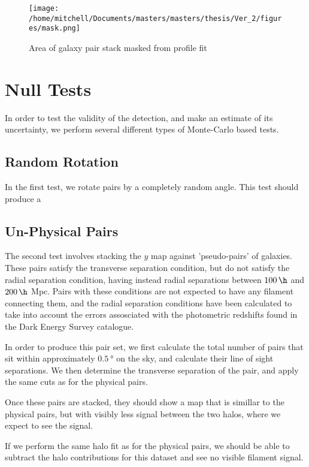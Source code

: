 \begin{figure}[h!]
\centering 
\texttt{[image: /home/mitchell/Documents/masters/masters/thesis/Ver\_2/figures/mask.png]}
\caption{Area of galaxy pair stack masked from profile fit}
\label{fig:fit_mask}
\end{figure}



\section{Null Tests}

In order to test the validity of the detection, and make an estimate of its uncertainty, we perform several different types of Monte-Carlo based tests. 

\subsection{Random Rotation}
In the first test, we rotate pairs by a completely random angle. This test should produce a 
\subsection{Un-Physical Pairs}
The second test involves stacking the $y$ map against 'pseudo-pairs' of galaxies. These pairs satisfy the transverse separation condition, but do not satisfy the radial separation condition, having instead radial separations between $\SI{100}{\per\h}$ and $\SI{200}{\per\h}$ Mpc. Pairs with these conditions are not expected to have any filament connecting them, and the radial separation conditions have been calculated to take into account the errors assosciated with the photometric redshifts found in the Dark Energy Survey catalogue. 
\par In order to produce this pair set, we first calculate the total number of pairs that sit within approximately $\SI{0.5}{\degree}$ on the sky, and calculate their line of sight separations. We then determine the transverse separation of the pair, and apply the same cuts as for the physical pairs. 
\par Once these pairs are stacked, they should show a map that is simillar to the physical pairs, but with visibly less signal between the two halos, where we expect to see the signal. 
\par If we perform the same halo fit as for the physical pairs, we should be able to subtract the halo contributions for this dataset and see no visible filament signal. 

